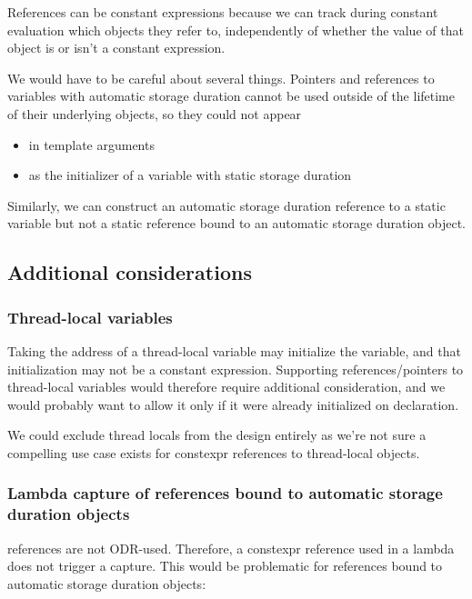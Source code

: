 \documentclass{wg21}
\begin{document}
References can be constant expressions because we can track during constant evaluation which objects they refer to, independently of whether the value of that object is or isn't a constant expression.

We would have to be careful about several things.
Pointers and references to variables with automatic storage duration cannot be used outside of the lifetime of their underlying objects, so they could not appear
\begin{itemize}
  \item in template arguments
  \item as the initializer of a variable with static storage duration
\end{itemize}

Similarly, we can construct an automatic storage duration  reference to a static variable but not a static  reference bound to an automatic storage duration object.

\subsection{Additional considerations}

\subsubsection{Thread-local variables}

Taking the address of a thread-local variable may initialize the variable, and that initialization may not be a constant expression.
Supporting references/pointers to thread-local variables would therefore require additional consideration, and we would probably want to allow it only if it were  already initialized
on declaration.

We could exclude thread locals from the design entirely as we're not sure a compelling use case exists for constexpr references to thread-local objects.

\subsubsection{Lambda capture of  references bound to automatic storage duration objects}

 references are not ODR-used.  Therefore, a constexpr reference used in a lambda does not trigger a capture.
This would be problematic for references bound to automatic storage duration objects:
\end{document}
